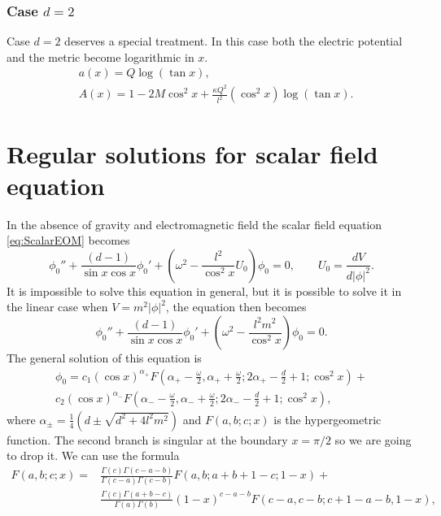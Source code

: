 \documentclass[a4paper,12pt]{article}
\begin{document}
\subsubsection{Case $d = 2$}
Case $d = 2$ deserves a special treatment. In this case both the electric potential and the metric become logarithmic in $x$.
\begin{subequations}
	\begin{align}
		&a(x) = Q\log(\tan x),\\
		&A(x) = 1 - 2 M \cos^2 x + \frac{\kappa Q^2}{l^2} (\cos^2 x) \log(\tan x).
	\end{align}
\end{subequations}

\section{Regular solutions for scalar field equation}
In the absence of gravity and electromagnetic field the scalar field equation \eqref{eq:ScalarEOM} becomes
\begin{equation}
	\phi_0'' + \frac{(d-1)}{\sin x \cos x}\phi_0' + \left(\omega^2 - \frac{l^2}{\cos^2 x } U_0\right) \phi_0 = 0,\qquad U_0 = \frac{d V}{d |\phi|^2}.
\end{equation}
It is impossible to solve this equation in general, but it is possible to solve it in the linear case when $V = m^2 |\phi|^2$, the equation then becomes
\begin{equation}
	\phi_0'' + \frac{(d-1)}{\sin x \cos x}\phi_0' + \left(\omega^2 - \frac{l^2 m^2}{\cos^2 x }\right) \phi_0 = 0.
\end{equation}
The general solution of this equation is
\begin{equation}
\begin{split}
	\phi_0 = c_1 (\cos x)^{\alpha_+} F\left(\alpha_+ - \frac{\omega}{2}, \alpha_+ + \frac{\omega}{2}; 2\alpha_+ -\frac{d}{2}+1; \cos^2 x\right) + \\
	c_2 (\cos x)^{\alpha_-} F\left(\alpha_- - \frac{\omega}{2}, \alpha_- + \frac{\omega}{2}; 2\alpha_- -\frac{d}{2}+1; \cos^2 x\right),
\end{split}
\end{equation}
where $\alpha_\pm = \frac{1}{4}(d \pm \sqrt{d^2 + 4 l^2 m^2})$ and $F(a,b;c;x)$ is the hypergeometric function. The second branch is singular at the boundary $x = \pi/2$ so we are going to drop it. We can use the formula
\begin{equation}
\begin{split}
	F(a,b;c;x) =& \frac{\Gamma(c)\Gamma(c-a-b)}{\Gamma(c-a)\Gamma(c-b)}F(a,b;a+b+1-c; 1-x) +\\ &\frac{\Gamma(c)\Gamma(a+b-c)}{\Gamma(a)\Gamma(b)}(1-x)^{c-a-b}F(c-a,c-b;c+1-a-b,1-x),
\end{split}
\end{equation}
\end{document}
